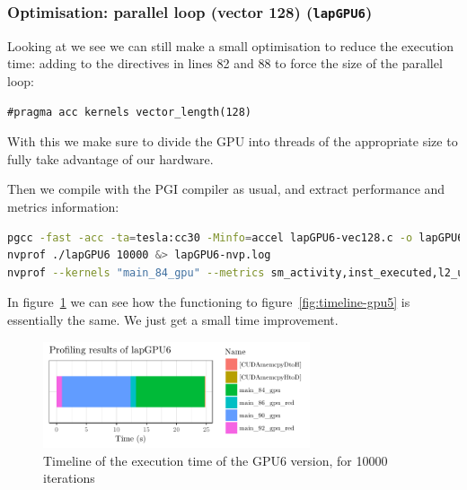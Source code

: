 \subsubsection{Optimisation: parallel loop (vector 128) (\texttt{lapGPU6})}
Looking at  we see we can still make a small optimisation to reduce the execution time: adding  to the  directives in lines 82 and 88 to force the size of the parallel loop:
\begin{lstlisting}[firstnumber=82]
#pragma acc kernels vector_length(128)
\end{lstlisting}

With this we make sure to divide the GPU into threads of the appropriate size to fully take advantage of our hardware.

Then we compile with the PGI compiler as usual, and extract performance and metrics information:
\begin{lstlisting}[language=bash]
pgcc -fast -acc -ta=tesla:cc30 -Minfo=accel lapGPU6-vec128.c -o lapGPU6 &> lapGPU6-comp.log
nvprof ./lapGPU6 10000 &> lapGPU6-nvp.log
nvprof --kernels "main_84_gpu" --metrics sm_activity,inst_executed,l2_utilization, dram_utilization,dram_read_throughput,dram_write_throughput,ipc ./lapGPU6 100 2> lapGPU6-metrics.log
\end{lstlisting}

In figure~\ref{fig:timeline-gpu6} we can see how the functioning to figure~\ref{fig:timeline-gpu5} is essentially the same. We just get a small time improvement.
\begin{figure}[H]
	\centering
	\includegraphics[width=0.7\textwidth]{images/timeline-gpu6}
	\caption{Timeline of the execution time of the GPU6 version, for \num{10000} iterations}
	\label{fig:timeline-gpu6}
\end{figure}

